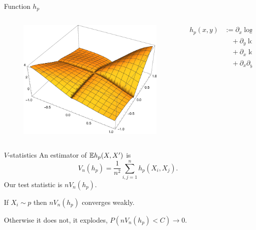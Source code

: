 \documentclass{beamer}
\begin{document}
\begin{frame}{Function $h_p$}

 \begin{columns}
        \begin{column}{.5\textwidth}
        \vspace{1cm}
        \begin{figure}
\advance\rightskip-2cm

           \includegraphics[width=\textwidth]{./img/h.pdf} 
        \end{figure}
        \end{column}
        \begin{column}{.5\textwidth}
        \vspace{-2cm}
           \begin{align*}
h_{p}(x,y) & := \partial_{x} \log p(x) \partial_{x} \log p(y) k(x,y)\\
 & \quad+\partial_{y}\log p(y) \partial_{x}  k(x,y)\\
 & \quad+\partial_{x}\log p(x) \partial_{y}k(x,y)\\
 & \quad+\partial_{x} \partial_{y} k(x,y),
\end{align*}
        \end{column}
    \end{columns}
 

 \end{frame}
 
 \begin{frame}{$V$-statistics}
An estimator of $\mathbb{E} h_p(X,X')$ is
\[
 V_n(h_p) = \frac {1} {n^2} \sum_{i,j=1}^n h_p(X_i,X_j).
\]
Our test statistic is $ n V_n(h_p)$.

If $X_i \sim p$ then $ n V_n(h_p)$  converges weakly. 

Otherwise it does not,  it explodes, $P(n V_n(h_p) <C) \to 0$.
 \end{frame}
 
\end{document}

